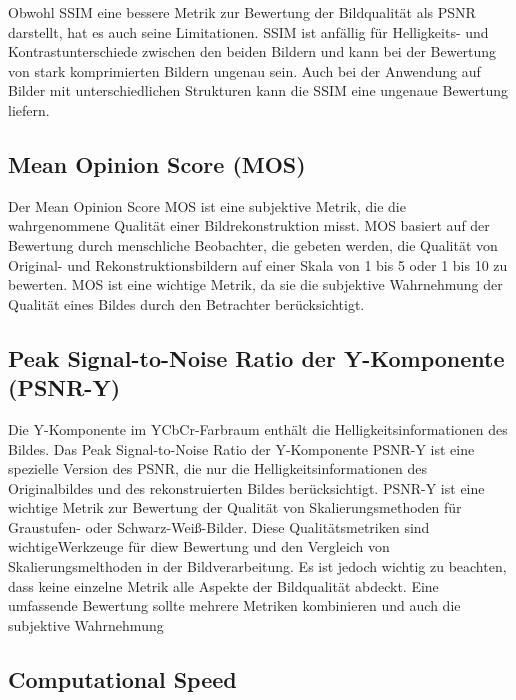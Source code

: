             Obwohl \ac{SSIM} eine bessere Metrik zur Bewertung der Bildqualität als \ac{PSNR} darstellt, hat es auch seine Limitationen. 
            \ac{SSIM} ist anfällig für Helligkeits- und Kontrastunterschiede zwischen den beiden Bildern und kann bei der Bewertung von stark komprimierten Bildern ungenau sein. 
            Auch bei der Anwendung auf Bilder mit unterschiedlichen Strukturen kann die \ac{SSIM} eine ungenaue Bewertung liefern.
    \subsection{Mean Opinion Score (MOS)}
        Der Mean Opinion Score \ac{MOS} ist eine subjektive Metrik, die die wahrgenommene Qualität einer Bildrekonstruktion misst.
        MOS basiert auf der Bewertung durch menschliche Beobachter, die gebeten werden, die Qualität von Original- und Rekonstruktionsbildern auf einer Skala von 1 bis 5 oder 1 bis 10 zu bewerten.
        MOS ist eine wichtige Metrik, da sie die subjektive Wahrnehmung der Qualität eines Bildes durch den Betrachter berücksichtigt.
        
    \subsection{Peak Signal-to-Noise Ratio der Y-Komponente (PSNR-Y)}
        Die Y-Komponente im YCbCr-Farbraum enthält die Helligkeitsinformationen des Bildes. 
        Das Peak Signal-to-Noise Ratio der Y-Komponente \ac{PSNR-Y} ist eine spezielle Version des \ac{PSNR}, die nur die Helligkeitsinformationen des Originalbildes und des rekonstruierten Bildes berücksichtigt. 
        \ac{PSNR}-Y ist eine wichtige Metrik zur Bewertung der Qualität von Skalierungsmethoden für Graustufen- oder Schwarz-Weiß-Bilder.        
        Diese Qualitätsmetriken sind wichtigeWerkzeuge für diew Bewertung und den Vergleich von Skalierungsmelthoden in der Bildverarbeitung.
        Es ist jedoch wichtig zu beachten, dass keine einzelne Metrik alle Aspekte der Bildqualität abdeckt. Eine umfassende Bewertung sollte mehrere Metriken kombinieren und auch die subjektive Wahrnehmung 
        
    \subsection{Computational Speed}
    
